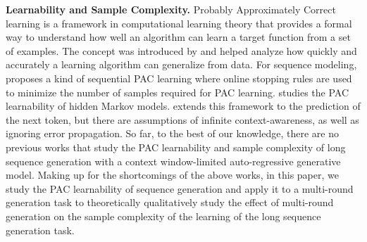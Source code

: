 \textbf{Learnability and Sample Complexity.} Probably Approximately Correct learning is a framework in computational learning theory that provides a formal way to understand how well an algorithm can learn a target function from a set of examples. The concept was introduced by \citet{valiant1984theory} and helped analyze how quickly and accurately a learning algorithm can generalize from data. For sequence modeling, \citet{schuurmans1995sequential} proposes a kind of sequential PAC learning where online stopping rules are used to minimize the number of samples required for PAC learning. \citet{gavalda2006pac} studies the PAC learnability of hidden Markov models. \citet{pmlr-v235-malach24a} extends this framework to the prediction of the next token, but there are assumptions of infinite context-awareness, as well as ignoring error propagation. So far, to the best of our knowledge, there are no previous works that study the PAC learnability and sample complexity of long sequence generation with a context window-limited auto-regressive generative model. Making up for the shortcomings of the above works, in this paper, we study the PAC learnability of sequence generation and apply it to a multi-round generation task to theoretically qualitatively study the effect of multi-round generation on the sample complexity of the learning of {\color{black}the} long sequence generation task.


